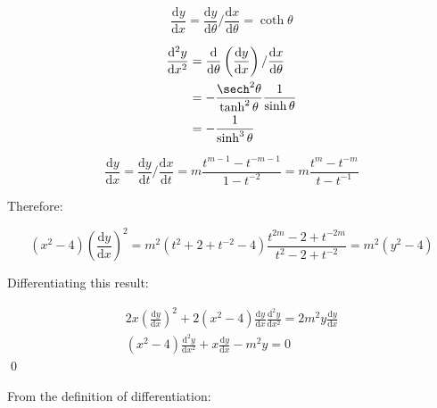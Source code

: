 \documentclass[12pt]{article}
\begin{document}


\begin{equation}
    \frac{\mathrm{d}y}{\mathrm{d}x} = \frac{\mathrm{d}y}{\mathrm{d}\theta}/\frac{\mathrm{d}x}{\mathrm{d}\theta} = \coth{\theta}
\end{equation}

\begin{equation}
    \begin{split}
        \frac{\mathrm{d}^{2}y}{\mathrm{d}x^{2}} &= \frac{\mathrm{d}}{\mathrm{d}\theta} \left( \frac{\mathrm{d}y}{\mathrm{d}x} \right) / \frac{\mathrm{d}x}{\mathrm{d}\theta} \\
        &= -\frac{\sech^{2}{\theta}}{\tanh^{2}{\theta}} \frac{1}{\sinh{\theta}} \\
        &= -\frac{1}{\sinh^{3}{\theta}}
    \end{split}
\end{equation}


\begin{equation}
    \frac{\mathrm{d}y}{\mathrm{d}x} = \frac{\mathrm{d}y}{\mathrm{d}t}/\frac{\mathrm{d}x}{\mathrm{d}t} = m \frac{t^{m - 1} - t^{-m - 1}}{1 - t^{-2}} = m \frac{t^{m} - t^{-m}}{t - t^{-1}}
\end{equation}

Therefore:

\begin{equation}
    (x^{2} - 4) \left( \frac{\mathrm{d}y}{\mathrm{d}x} \right)^{2} = m^{2} (t^{2} + 2 + t^{-2} - 4) \frac{t^{2m} - 2 + t^{-2m}}{t^{2} - 2 + t^{-2}} = m^{2} (y^{2} - 4)
\end{equation}

Differentiating this result:

\begin{equation}
    \begin{split}
        2x \left( \frac{\mathrm{d}y}{\mathrm{d}x} \right)^{2} + 2 (x^{2} - 4) \frac{\mathrm{d}y}{\mathrm{d}x} \frac{\mathrm{d}^{2}y}{\mathrm{d}x^{2}} = 2m^{2}y \frac{\mathrm{d}y}{\mathrm{d}x} \\
        (x^{2} - 4) \frac{\mathrm{d}^{2}y}{\mathrm{d}x^{2}} + x \frac{\mathrm{d}y}{\mathrm{d}x} - m^{2}y = 0
    \end{split}
\end{equation}
\qed


From the definition of differentiation:
\end{document}
